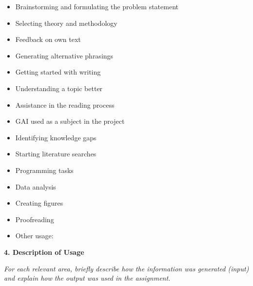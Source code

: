 \documentclass[12pt,a4paper]{article}
\newcommand{\checked}{$\boxtimes$}
\newcommand{\unchecked}{$\square$}
\begin{document}
\begin{itemize}[nosep, leftmargin=1.5em]
  \item[\unchecked] Brainstorming and formulating the problem statement
  \item[\unchecked] Selecting theory and methodology
  \item[\unchecked] Feedback on own text
  \item[\unchecked] Generating alternative phrasings
  \item[\unchecked] Getting started with writing
  \item[\unchecked] Understanding a topic better
  \item[\unchecked] Assistance in the reading process
  \item[\unchecked] GAI used as a subject in the project
  \item[\unchecked] Identifying knowledge gaps
  \item[\unchecked] Starting literature searches
  \item[\unchecked] Programming tasks
  \item[\unchecked] Data analysis
  \item[\unchecked] Creating figures
  \item[\unchecked] Proofreading
  \item[\unchecked] Other usage: \hrulefill
\end{itemize}

\vspace{0.5cm}

{\normalsize\bfseries 4. Description of Usage\par}
\vspace{2pt}

\textit{For each relevant area, briefly describe how the information
was generated (input) and explain how the output was used in the
assignment.}

\vspace{1cm}

\end{document}
